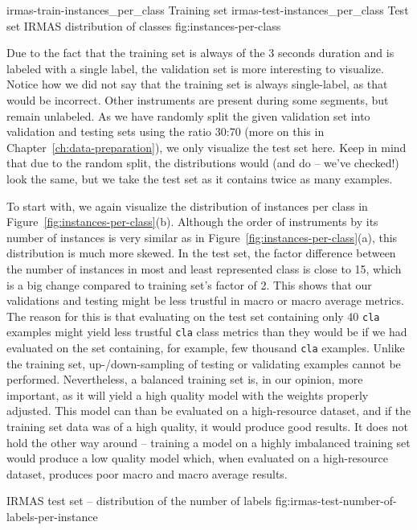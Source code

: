 \asideimages{7.3cm}{7.3cm}
	    {irmas-train-instances_per_class}
	    {Training set}
	    {irmas-test-instances_per_class}
	    {Test set}
	    {IRMAS distribution of classes}
	    {fig:instances-per-class}

Due to the fact that the training set is always of the 3 seconds duration and is labeled with a single label, the validation set is more interesting to visualize. Notice how we did not say that the training set is always single-label, as that would be incorrect. Other instruments are present during some segments, but remain unlabeled. As we have randomly split the given validation set into validation and testing sets using the ratio 30:70 (more on this in Chapter~\ref{ch:data-preparation}), we only visualize the test set here. Keep in mind that due to the random split, the distributions would (and do -- we've checked!) look the same, but we take the test set as it contains twice as many examples. 

To start with, we again visualize the distribution of instances per class in Figure~\ref{fig:instances-per-class}(b). Although the order of instruments by its number of instances is very similar as in Figure~\ref{fig:instances-per-class}(a), this distribution is much more skewed. In the test set, the factor difference between the number of instances in most and least represented class is close to 15, which is a big change compared to training set's factor of 2. This shows that our validations and testing might be less trustful in macro or macro average metrics. The reason for this is that evaluating on the test set containing only 40 \texttt{cla} examples might yield less trustful \texttt{cla} class metrics than they would be if we had evaluated on the set containing, for example, few thousand \texttt{cla} examples. Unlike the training set, up-/down-sampling of testing or validating examples cannot be performed. Nevertheless, a balanced training set is, in our opinion, more important, as it will yield a high quality model with the weights properly adjusted. This model can than be evaluated on a high-resource dataset, and if the training set data was of a high quality, it would produce good results. It does not hold the other way around -- training a model on a highly imbalanced training set would produce a low quality model which, when evaluated on a high-resource dataset, produces poor macro and macro average results. 

			{IRMAS test set -- distribution of the number of labels}
			{fig:irmas-test-number-of-labels-per-instance}

